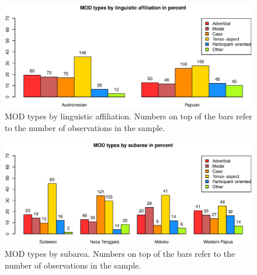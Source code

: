 \begin{figure}[t]
\includegraphics[width=\columnwidth]{figures/MOD_Family.eps}
\caption[MOD types by linguistic affiliation]{MOD types by linguistic affiliation. Numbers on top of the bars refer to the number of observations in the sample.}\label{fig:mod-family}
\end{figure}
\begin{figure}[t]
\includegraphics[width=\columnwidth]{figures/MOD_Group.eps}
\caption[MOD types by subarea]{MOD types by subarea. Numbers on top of the bars refer to the number of observations in the sample.}\label{fig:mod-group}
\end{figure}



